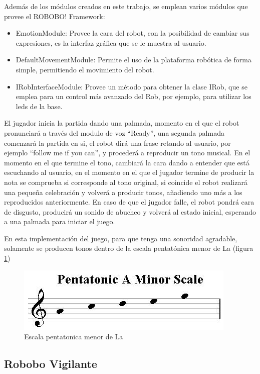 Además de los módulos creados en este trabajo, se emplean varios módulos que provee el ROBOBO! Framework:

\begin{itemize}
	\item EmotionModule: Provee la cara del robot, con la posibilidad de cambiar sus expresiones, es la interfaz gráfica que se le muestra al usuario.
	\item DefaultMovementModule: Permite el uso de la plataforma robótica de forma simple, permitiendo el movimiento del robot.
	\item IRobInterfaceModule: Provee un método para obtener la clase IRob, que se emplea para un control más avanzado del Rob, por ejemplo, para utilizar los leds de la base.
\end{itemize}

El jugador inicia la partida dando una palmada, momento en el que el robot pronunciará a través del modulo de voz \enquote{Ready}, una segunda palmada comenzará la partida en si, el robot dirá una frase retando al usuario, por ejemplo \enquote{follow me if you can}, y procederá a reproducir un tono musical. En el momento en el que termine el tono, cambiará la cara dando a entender que está escuchando al usuario, en el momento en el que el jugador termine de producir la nota se comprueba si corresponde al tono original, si coincide el robot realizará una pequeña celebración y volverá a producir tonos, añadiendo uno más a los reproducidos anteriormente. En caso de que el jugador falle, el robot pondrá cara de disgusto, producirá un sonido de abucheo y volverá al estado inicial, esperando a una palmada para iniciar el juego.

En esta implementación del juego, para que tenga una sonoridad agradable, solamente se producen tonos dentro de la escala pentatónica menor de La (figura \ref{fig:pentatonic-scale})

\begin{figure}
	\centering
	\includegraphics[width=0.6\linewidth]{imagenes/pentatonic-scale-a-minor.jpg}
	\caption{Escala pentatonica menor de La}
	\label{fig:pentatonic-scale}
\end{figure} 

\subsection{Robobo Vigilante}
